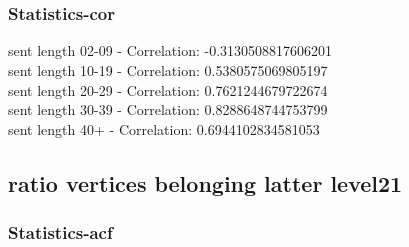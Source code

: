 \documentclass{article}%
\begin{document}
\begin{figure}[ht]%
\centering%
\setlength{\abovecaptionskip}{-35pt}%
%
%
\\%
%
%
\\%
%
\end{figure}

%
\newpage%
\subsubsection{Statistics{-}cor}%
\label{ssubsec:Statistics{-}cor}%
\noindent%
sent length 02-09 - Correlation: -0.3130508817606201\\%
sent length 10-19 - Correlation: 0.5380575069805197\\%
sent length 20-29 - Correlation: 0.7621244679722674\\%
sent length 30-39 - Correlation: 0.8288648744753799\\%
sent length 40+ - Correlation: 0.6944102834581053\\

%
\newpage

%
\subsection{ratio vertices belonging latter level21}%
\label{subsec:ratioverticesbelonginglatterlevel21}%
\subsubsection{Statistics{-}acf}%
\label{ssubsec:Statistics{-}acf}%
\end{document}
